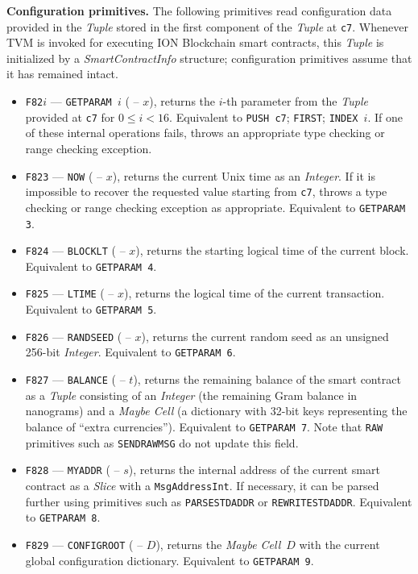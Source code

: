\documentclass[12pt,oneside]{article}
\def\makepoint#1{\medbreak\noindent{\bf #1.\ }}
\def\nxsubpoint{\refstepcounter{subsubsection}%
  \smallbreak\makepoint{\thesubsubsection}}
\def\emb#1{\textbf{#1.}}
\begin{document}
\nxsubpoint\emb{Configuration primitives}\label{sp:prim.conf.param}
The following primitives read configuration data provided in the {\em Tuple\/} stored in the first component of the {\em Tuple\/} at {\tt c7}. Whenever TVM is invoked for executing ION Blockchain smart contracts, this {\em Tuple\/} is initialized by a {\em SmartContractInfo\/} structure; configuration primitives assume that it has remained intact.
\begin{itemize}
\item {\tt F82$i$} --- {\tt GETPARAM $i$} ( -- $x$), returns the $i$-th parameter from the {\em Tuple\/} provided at {\tt c7} for $0\leq i<16$. Equivalent to {\tt PUSH c7}; {\tt FIRST}; {\tt INDEX $i$}. If one of these internal operations fails, throws an appropriate type checking or range checking exception.
\item {\tt F823} --- {\tt NOW} ( -- $x$), returns the current Unix time as an {\em Integer}. If it is impossible to recover the requested value starting from {\tt c7}, throws a type checking or range checking exception as appropriate. Equivalent to {\tt GETPARAM 3}.
\item {\tt F824} --- {\tt BLOCKLT} ( -- $x$), returns the starting logical time of the current block. Equivalent to {\tt GETPARAM 4}.
\item {\tt F825} --- {\tt LTIME} ( -- $x$), returns the logical time of the current transaction. Equivalent to {\tt GETPARAM 5}.
\item {\tt F826} --- {\tt RANDSEED} ( -- $x$), returns the current random seed as an unsigned 256-bit {\em Integer}. Equivalent to {\tt GETPARAM 6}.
\item {\tt F827} --- {\tt BALANCE} ( -- $t$), returns the remaining balance of the smart contract as a {\em Tuple\/} consisting of an {\em Integer} (the remaining Gram balance in nanograms) and a {\em Maybe Cell} (a dictionary with 32-bit keys representing the balance of ``extra currencies''). Equivalent to {\tt GETPARAM 7}. Note that {\tt RAW} primitives such as {\tt SENDRAWMSG} do not update this field.
\item {\tt F828} --- {\tt MYADDR} ( -- $s$), returns the internal address of the current smart contract as a {\em Slice\/} with a {\tt MsgAddressInt}. If necessary, it can be parsed further using primitives such as {\tt PARSESTDADDR} or {\tt REWRITESTDADDR}. Equivalent to {\tt GETPARAM 8}.
\item {\tt F829} --- {\tt CONFIGROOT} ( -- $D$), returns the {\em Maybe Cell\/}~$D$ with the current global configuration dictionary. Equivalent to {\tt GETPARAM 9}.

\end{itemize}
\end{document}
